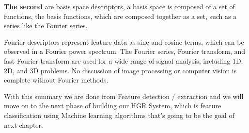 \textbf{The second } are basis space descriptors, a basis space is composed of a set of functions, the basis functions, which are
composed together as a set, such as a series like the Fourier series. 

Fourier descriptors represent feature data as sine and cosine terms, which can be
observed in a Fourier power spectrum. The Fourier series, Fourier transform, and fast
Fourier transform are used for a wide range of signal analysis, including 1D, 2D, and 3D
problems. No discussion of image processing or computer vision is complete without
Fourier methods.

With this summary we are done from Feature detection / extraction and we will move on to the next phase of building  our HGR System, which is  feature classification using Machine learning algorithms that's going to be the goal of next chapter.
